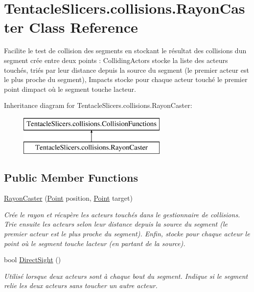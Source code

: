 \hypertarget{class_tentacle_slicers_1_1collisions_1_1_rayon_caster}{}\section{Tentacle\+Slicers.\+collisions.\+Rayon\+Caster Class Reference}
\label{class_tentacle_slicers_1_1collisions_1_1_rayon_caster}


Facilite le test de collision des segments en stockant le résultat des collisions d\textquotesingle{}un segment crée entre deux points \+: Colliding\+Actors stocke la liste des acteurs touchés, triés par leur distance depuis la source du segment (le premier acteur est le plus proche du segment), Impacts stocke pour chaque acteur touché le premier point d\textquotesingle{}impact où le segment touche l\textquotesingle{}acteur.  


Inheritance diagram for Tentacle\+Slicers.\+collisions.\+Rayon\+Caster\+:\begin{figure}[H]
\begin{center}
\leavevmode
\includegraphics[height=2.000000cm]{class_tentacle_slicers_1_1collisions_1_1_rayon_caster}
\end{center}
\end{figure}
\subsection*{Public Member Functions}
\begin{DoxyCompactItemize}
\item 
\hyperlink{class_tentacle_slicers_1_1collisions_1_1_rayon_caster_ae43e7cab7009f87dc9aac003339b8a71}{Rayon\+Caster} (\hyperlink{class_tentacle_slicers_1_1general_1_1_point}{Point} position, \hyperlink{class_tentacle_slicers_1_1general_1_1_point}{Point} target)
\begin{DoxyCompactList}\small\item\em Crée le rayon et récupère les acteurs touchés dans le gestionnaire de collisions. Trie ensuite les acteurs selon leur distance depuis la source du segment (le premier acteur est le plus proche du segment). Enfin, stocke pour chaque acteur le point où le segment touche l\textquotesingle{}acteur (en partant de la source). \end{DoxyCompactList}\item 
bool \hyperlink{class_tentacle_slicers_1_1collisions_1_1_rayon_caster_aa9938228630292ef5142e87968d336d7}{Direct\+Sight} ()
\begin{DoxyCompactList}\small\item\em Utilisé lorsque deux acteurs sont à chaque bout du segment. Indique si le segment relie les deux acteurs sans toucher un autre acteur. \end{DoxyCompactList}\end{DoxyCompactItemize}
